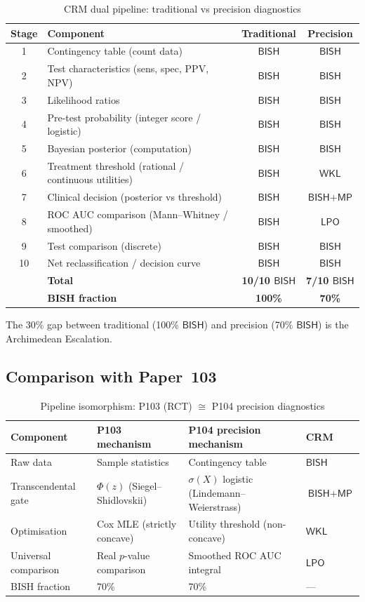 \documentclass[11pt,a4paper]{article}
\theoremstyle{plain}
\theoremstyle{definition}
\newcommand{\BISH}{\textsf{BISH}}
\newcommand{\WKL}{\textsf{WKL}}
\newcommand{\LPO}{\textsf{LPO}}
\newcommand{\MP}{\textsf{MP}}
\begin{document}
\begin{table}[ht]
\centering
\caption{CRM dual pipeline: traditional vs precision diagnostics}
\label{tab:dual-pipeline}
\begin{tabular}{clcc}
\toprule
Stage & Component & Traditional & Precision \\
\midrule
1 & Contingency table (count data) & $\BISH$ & $\BISH$ \\
2 & Test characteristics (sens, spec, PPV, NPV) & $\BISH$ & $\BISH$ \\
3 & Likelihood ratios & $\BISH$ & $\BISH$ \\
4 & Pre-test probability (integer score / logistic) & $\BISH$ & $\BISH$ \\
5 & Bayesian posterior (computation) & $\BISH$ & $\BISH$ \\
6 & Treatment threshold (rational / continuous utilities) & $\BISH$ & $\WKL$ \\
7 & Clinical decision (posterior vs threshold) & $\BISH$ & $\BISH + \MP$ \\
8 & ROC AUC comparison (Mann--Whitney / smoothed) & $\BISH$ & $\LPO$ \\
9 & Test comparison (discrete) & $\BISH$ & $\BISH$ \\
10 & Net reclassification / decision curve & $\BISH$ & $\BISH$ \\
\midrule
& \textbf{Total} & \textbf{10/10 $\BISH$} & \textbf{7/10 $\BISH$} \\
& \textbf{BISH fraction} & \textbf{100\%} & \textbf{70\%} \\
\bottomrule
\end{tabular}
\end{table}

The 30\% gap between traditional (100\% $\BISH$) and precision (70\% $\BISH$) is the Archimedean Escalation.

\subsection{Comparison with Paper~103}

\begin{table}[ht]
\centering
\caption{Pipeline isomorphism: P103 (RCT) $\cong$ P104 precision diagnostics}
\label{tab:comparison}
\begin{tabular}{llll}
\toprule
Component & P103 mechanism & P104 precision mechanism & CRM \\
\midrule
Raw data & Sample statistics & Contingency table & $\BISH$ \\
Transcendental gate & $\Phi(z)$ (Siegel--Shidlovskii) & $\sigma(X)$ logistic (Lindemann--Weierstrass) & $\BISH + \MP$ \\
Optimisation & Cox MLE (strictly concave) & Utility threshold (non-concave) & $\WKL$ \\
Universal comparison & Real $p$-value comparison & Smoothed ROC AUC integral & $\LPO$ \\
BISH fraction & 70\% & 70\% & --- \\
\bottomrule
\end{tabular}
\end{table}
\end{document}
